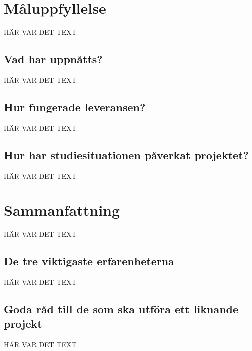 \documentclass[a4paper,titlepage,12pt]{article}
\begin{document}
	
	\section{Måluppfyllelse}
	HÄR VAR DET TEXT
	
	\subsection{Vad har uppnåtts?}
	HÄR VAR DET TEXT
	
	\subsection{Hur fungerade leveransen?}
	HÄR VAR DET TEXT
	
	\subsection{Hur har studiesituationen påverkat projektet?}
	HÄR VAR DET TEXT
	
	\section{Sammanfattning}
	HÄR VAR DET TEXT
	
	\subsection{De tre viktigaste erfarenheterna}
	HÄR VAR DET TEXT
	
	\subsection{Goda råd till de som ska utföra ett liknande projekt}
	HÄR VAR DET TEXT
	
\end{document}
